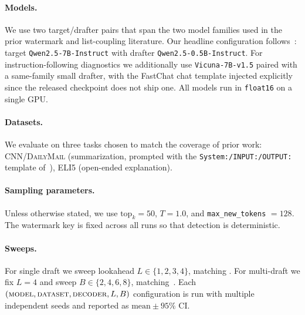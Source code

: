 \documentclass{article}
\theoremstyle{plain}
\theoremstyle{definition}
\begin{document}
\paragraph{Models.}
We use two target/drafter pairs that span the two model families used
in the prior watermark and list-coupling literature.
Our headline configuration follows~\citet{rowan2025list}: target
\texttt{Qwen2.5-7B-Instruct} with drafter \texttt{Qwen2.5-0.5B-Instruct}.
For instruction-following diagnostics we additionally use
\texttt{Vicuna-7B-v1.5} paired with a same-family small drafter,
with the FastChat chat template injected explicitly since the released
checkpoint does not ship one.
All models run in \texttt{float16} on a single GPU.

\paragraph{Datasets.}
We evaluate on three tasks chosen to match the coverage of prior work:
\textsc{CNN/DailyMail} (summarization, prompted with the
\texttt{System:/INPUT:/OUTPUT:} template of~\citet{hu2024inevitable}),
\textsc{ELI5} (open-ended explanation).

\paragraph{Sampling parameters.}
Unless otherwise stated, we use $\mathrm{top}_k = 50$, $T = 1.0$, and \texttt{max\_new\_tokens} $= 128$. The watermark key
is fixed across all runs so that detection is deterministic.

\paragraph{Sweeps.}
For single draft we sweep lookahead $L \in \{1,2,3,4\}$, matching
\citet{hu2024inevitable}.
For multi-draft we fix $L = 4$ and sweep
$B \in \{2, 4, 6, 8\}$, matching~\citet{rowan2025list}.
Each $(\textsc{model}, \textsc{dataset}, \textsc{decoder}, L, B)$
configuration is run with multiple independent seeds and reported as
$\textrm{mean} \pm 95\%$ CI.
\end{document}
